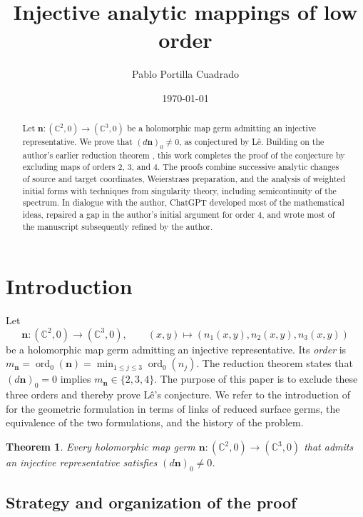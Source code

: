 \documentclass[11pt,letterpaper]{article}
\title{Injective analytic mappings of low order}
\author{Pablo Portilla Cuadrado}
\date{\today}
\numberwithin{equation}{section}
\newtheorem{theorem}[theorem]{Theorem}
\theoremstyle{remark}
\theoremstyle{plain}
\newcommand{\C}{\mathbb{C}}
\newcommand{\ord}{\operatorname{ord}}
\begin{document}
\maketitle

\begin{abstract}
Let $\boldsymbol n:(\C^2,0)\to(\C^3,0)$ be a holomorphic map germ
admitting an injective representative.  We prove that
$(d\boldsymbol n)_0\neq0$, as conjectured by L\^e.
Building on the author's earlier reduction theorem
\cite{PortillaReduction}, this work completes the proof of the conjecture by
excluding maps of orders $2$, $3$, and $4$.
The proofs combine successive analytic changes of source and target
coordinates, Weierstrass preparation, and the analysis of weighted
initial forms with techniques from singularity theory, including
semicontinuity of the spectrum. In dialogue with the author, ChatGPT
developed most of the mathematical ideas, repaired a gap in the author's
initial argument for order $4$, and wrote most of the manuscript subsequently 
refined by the author.
\end{abstract}

\section{Introduction}

Let
\[
 \boldsymbol n:(\C^2,0)\longrightarrow(\C^3,0),\qquad
 (x,y)\longmapsto(n_1(x,y),n_2(x,y),n_3(x,y))
\]
be a holomorphic map germ admitting an injective representative.
Its \emph{order} is
$
 m_{\boldsymbol n}=\ord_0(\boldsymbol n)
 =\min_{1\leq j\leq3}\ord_0(n_j).
$
The reduction theorem \cite[Theorem~1.1]{PortillaReduction} states that
$(d\boldsymbol n)_0=0$ implies
$m_{\boldsymbol n}\in\{2,3,4\}$.  The purpose of this paper is to
exclude these three orders and thereby prove L\^e's conjecture.
We refer to the introduction of
\cite{PortillaReduction} for the geometric formulation in terms of
links of reduced surface germs, the equivalence of the two formulations,
and the history of the problem.

\begin{theorem}
\label{thm:main}
Every holomorphic map germ
$
 \boldsymbol n:(\C^2,0)\longrightarrow(\C^3,0)
$
that admits an injective representative satisfies
$(d\boldsymbol n)_0\neq0$.
\end{theorem}

\subsection*{Strategy and organization of the proof}
\label{sec:strategy}
\end{document}
